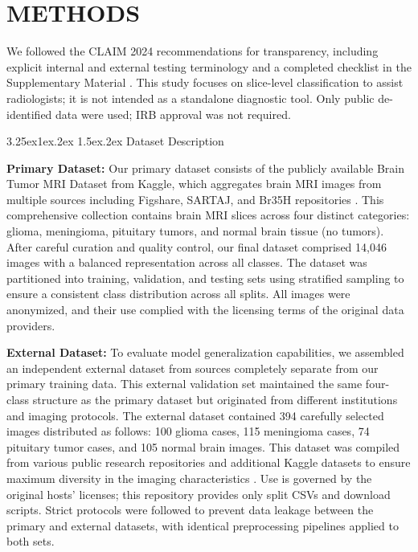 \documentclass[conference]{IEEEtran}
\makeatletter
\renewcommand{\subsection}{%
  \@startsection{subsection}{2}{\z@}%
  {3.25ex\@plus1ex\@minus.2ex}%
  {1.5ex\@plus.2ex}%
  {\normalfont}%
}
\makeatother
\begin{document}
\section{METHODS}

We followed the CLAIM 2024 recommendations for transparency, including explicit internal and external testing terminology and a completed checklist in the Supplementary Material \cite{mongan2024}. This study focuses on slice-level classification to assist radiologists; it is not intended as a standalone diagnostic tool. Only public de-identified data were used; IRB approval was not required.

\subsection{\normalfont Dataset Description}

\textbf{Primary Dataset:} Our primary dataset consists of the publicly available Brain Tumor MRI Dataset from Kaggle, which aggregates brain MRI images from multiple sources including Figshare, SARTAJ, and Br35H repositories \cite{kaggle_brain_tumor}. This comprehensive collection contains brain MRI slices across four distinct categories: glioma, meningioma, pituitary tumors, and normal brain tissue (no tumors). After careful curation and quality control, our final dataset comprised 14,046 images with a balanced representation across all classes. The dataset was partitioned into training, validation, and testing sets using stratified sampling to ensure a consistent class distribution across all splits. All images were anonymized, and their use complied with the licensing terms of the original data providers.

\textbf{External Dataset:} To evaluate model generalization capabilities, we assembled an independent external dataset from sources completely separate from our primary training data. This external validation set maintained the same four-class structure as the primary dataset but originated from different institutions and imaging protocols. The external dataset contained 394 carefully selected images distributed as follows: 100 glioma cases, 115 meningioma cases, 74 pituitary tumor cases, and 105 normal brain images. This dataset was compiled from various public research repositories and additional Kaggle datasets to ensure maximum diversity in the imaging characteristics \cite{external_dataset}. Use is governed by the original hosts' licenses; this repository provides only split CSVs and download scripts. Strict protocols were followed to prevent data leakage between the primary and external datasets, with identical preprocessing pipelines applied to both sets.
\end{document}
